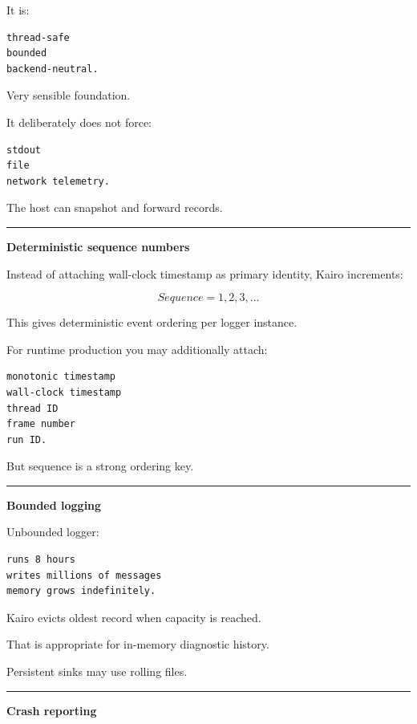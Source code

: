 It is:

\begin{verbatim}
thread-safe
bounded
backend-neutral.
\end{verbatim}

Very sensible foundation.

It deliberately does not force:

\begin{verbatim}
stdout
file
network telemetry.
\end{verbatim}

The host can snapshot and forward records.

\begin{center}\rule{0.5\linewidth}{0.5pt}\end{center}

\textbf{Deterministic sequence numbers}

Instead of attaching wall-clock timestamp as primary identity, Kairo increments:

\[
Sequence=1,2,3,\dots
\]

This gives deterministic event ordering per logger instance.

For runtime production you may additionally attach:

\begin{verbatim}
monotonic timestamp
wall-clock timestamp
thread ID
frame number
run ID.
\end{verbatim}

But sequence is a strong ordering key.

\begin{center}\rule{0.5\linewidth}{0.5pt}\end{center}

\textbf{Bounded logging}

Unbounded logger:

\begin{verbatim}
runs 8 hours
writes millions of messages
memory grows indefinitely.
\end{verbatim}

Kairo evicts oldest record when capacity is reached.

That is appropriate for in-memory diagnostic history.

Persistent sinks may use rolling files.

\begin{center}\rule{0.5\linewidth}{0.5pt}\end{center}

\textbf{Crash reporting}


